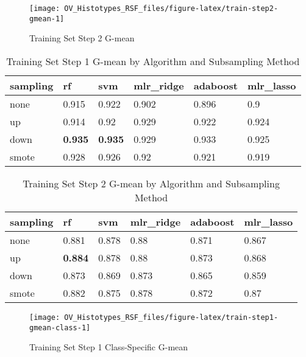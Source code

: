 \documentclass[
]{report}
\begin{document}
\begin{figure}[H]

{\centering \texttt{[image: OV\_Histotypes\_RSF\_files/figure-latex/train-step2-gmean-1]} 

}

\caption{Training Set Step 2 G-mean}\label{fig:train-step2-gmean}
\end{figure}

\begin{table}

\caption{\label{tab:train-step1-gmean-table}Training Set Step 1 G-mean by Algorithm and Subsampling Method}
\centering
\begin{tabular}[t]{l|l|l|l|l|l}
\hline
sampling & rf & svm & mlr\_ridge & adaboost & mlr\_lasso\\
\hline
none & 0.915 & 0.922 & 0.902 & 0.896 & 0.9\\
\hline
up & 0.914 & 0.92 & 0.929 & 0.922 & 0.924\\
\hline
down & \textbf{0.935} & \textbf{0.935} & 0.929 & 0.933 & 0.925\\
\hline
smote & 0.928 & 0.926 & 0.92 & 0.921 & 0.919\\
\hline
\end{tabular}
\end{table}

\begin{table}

\caption{\label{tab:train-step2-gmean-table}Training Set Step 2 G-mean by Algorithm and Subsampling Method}
\centering
\begin{tabular}[t]{l|l|l|l|l|l}
\hline
sampling & rf & svm & mlr\_ridge & adaboost & mlr\_lasso\\
\hline
none & 0.881 & 0.878 & 0.88 & 0.871 & 0.867\\
\hline
up & \textbf{0.884} & 0.878 & 0.88 & 0.873 & 0.868\\
\hline
down & 0.873 & 0.869 & 0.873 & 0.865 & 0.859\\
\hline
smote & 0.882 & 0.875 & 0.878 & 0.872 & 0.87\\
\hline
\end{tabular}
\end{table}

\begin{figure}[H]

{\centering \texttt{[image: OV\_Histotypes\_RSF\_files/figure-latex/train-step1-gmean-class-1]} 

}

\caption{Training Set Step 1 Class-Specific G-mean}\label{fig:train-step1-gmean-class}
\end{figure}
\end{document}
